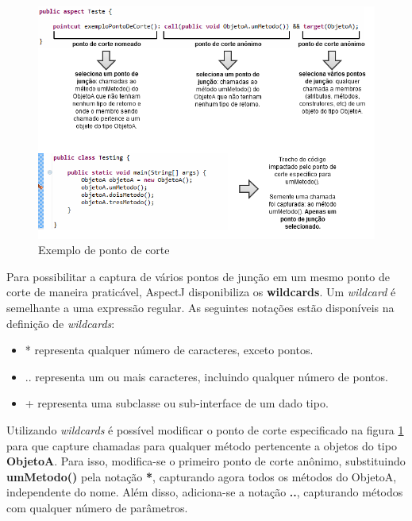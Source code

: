 \begin{figure}
	\centering
	\includegraphics{img/pointcut_vs_joinpoint.png}
	\caption{Exemplo de ponto de corte}\label{fig:pointcut_vs_joinpoint}
\end{figure}

Para possibilitar a captura de vários pontos de junção em um mesmo ponto de
corte de maneira praticável, AspectJ disponibiliza os \textbf{wildcards}. 
Um \textit{wildcard} é semelhante a uma expressão regular. As seguintes notações
estão disponíveis na definição de \textit{wildcards}:

\begin{itemize}
  \item * representa qualquer número de caracteres, exceto pontos.
  \item .. representa um ou mais caracteres, incluindo qualquer número de
  pontos.
  \item + representa uma subclasse ou sub-interface de um dado tipo.
\end{itemize}

Utilizando \textit{wildcards} é possível modificar o ponto de corte especificado na figura \ref{fig:pointcut_vs_joinpoint} para que capture chamadas
para qualquer método pertencente a objetos do tipo \textbf{ObjetoA}. Para isso, modifica-se o primeiro ponto de corte anônimo, substituindo
\textbf{umMetodo()} pela notação \textbf{*}, capturando agora todos os métodos do ObjetoA, independente do nome. Além disso, adiciona-se a 
notação \textbf{..}, capturando métodos com qualquer número de parâmetros. 

